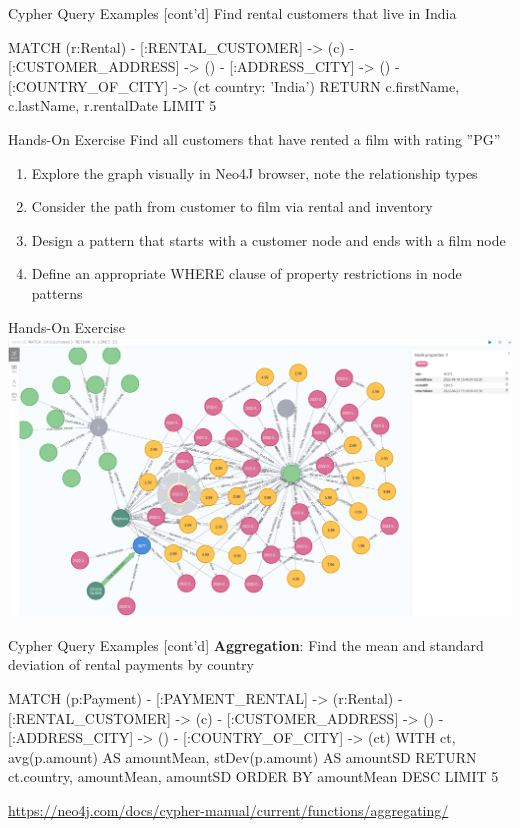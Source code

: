 \documentclass[ignorenonframetext,xcolor=x11names]{beamer}
\begin{document}
\begin{frame}[fragile]{Cypher Query Examples \small [cont'd]}
Find rental customers that live in India
\footnotesize
\begin{cyphercode}
MATCH (r:Rental) 
        - [:RENTAL_CUSTOMER] -> (c) 
        - [:CUSTOMER_ADDRESS] -> () 
        - [:ADDRESS_CITY] -> ()
        - [:COUNTRY_OF_CITY] -> (ct {country: 'India'})
RETURN c.firstName, c.lastName, r.rentalDate LIMIT 5
\end{cyphercode}
\end{frame}

\begin{frame}{Hands-On Exercise}
\large
Find all customers that have rented a film with rating ''PG''\\
\normalsize
\begin{enumerate}
  \item Explore the graph visually in Neo4J browser, note the relationship types
  \item Consider the path from customer to film via rental and inventory
  \item Design a pattern that starts with a customer node and ends with a film node
  \item Define an appropriate WHERE clause of property restrictions in node patterns
\end{enumerate}
\end{frame}

\begin{frame}{Hands-On Exercise}
\includegraphics[width=\textwidth]{screen14.png}
\end{frame}


\begin{frame}[fragile]{Cypher Query Examples \small [cont'd]}
\textbf{Aggregation}: Find the mean and standard deviation of rental payments by country
\footnotesize
\begin{cyphercode}
MATCH (p:Payment) 
        - [:PAYMENT_RENTAL] -> (r:Rental) 
        - [:RENTAL_CUSTOMER] -> (c) 
        - [:CUSTOMER_ADDRESS] -> () 
        - [:ADDRESS_CITY] -> ()
        - [:COUNTRY_OF_CITY] -> (ct)
WITH ct, 
     avg(p.amount) AS amountMean, 
     stDev(p.amount) AS amountSD
RETURN ct.country, amountMean, amountSD
ORDER BY amountMean DESC LIMIT 5
\end{cyphercode}

\scriptsize
\url{https://neo4j.com/docs/cypher-manual/current/functions/aggregating/}
\end{frame}
\end{document}
